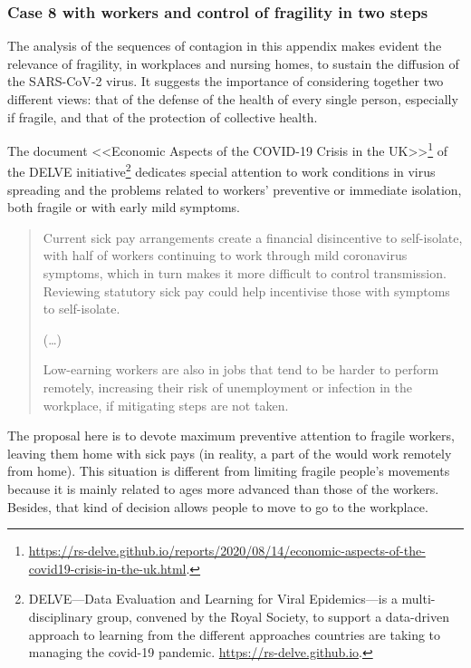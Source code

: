 \documentclass[graybox]{svmult}
\begin{document}
\subsubsection{Case 8 with workers and control of fragility in two steps}
\label{c8}


The analysis of the sequences of contagion in this appendix makes evident the relevance of fragility, in workplaces and nursing homes, to sustain the diffusion of the SARS-CoV-2 virus. It suggests the importance of considering together two different views: that of the defense of the health of every single person, especially if fragile, and that of the protection of collective health.

The document 
<<Economic Aspects of the COVID-19 Crisis in the UK>>\footnote{\url{https://rs-delve.github.io/reports/2020/08/14/economic-aspects-of-the-covid19-crisis-in-the-uk.html}.}
of the DELVE initiative\footnote{DELVE---Data Evaluation and Learning for Viral Epidemics---is a multi-disciplinary group, convened by the Royal Society, to support a data-driven approach to learning from the different approaches countries are taking to managing the covid-19 pandemic. \url{https://rs-delve.github.io}.}
dedicates special attention to work conditions in virus spreading and the problems related to workers' preventive or immediate isolation, both fragile or with early mild symptoms.

\begin{quote}
Current sick pay arrangements create a financial disincentive to self-isolate, with half of workers continuing to work through mild coronavirus symptoms, which in turn makes it more difficult to control transmission. Reviewing statutory sick pay could help incentivise those with symptoms to self-isolate.

(\ldots)

Low-earning workers are also in jobs that tend to be harder to perform remotely, increasing their risk of unemployment or infection in the workplace, if mitigating steps are not taken.
\end{quote}

The proposal here is to devote maximum preventive attention to fragile workers, leaving them home with sick pays (in reality, a part of the would work remotely from home). This situation is different from limiting fragile people's movements because it is mainly related to ages more advanced than those of the workers. Besides, that kind of decision allows people to move to go to the workplace. 
\end{document}
